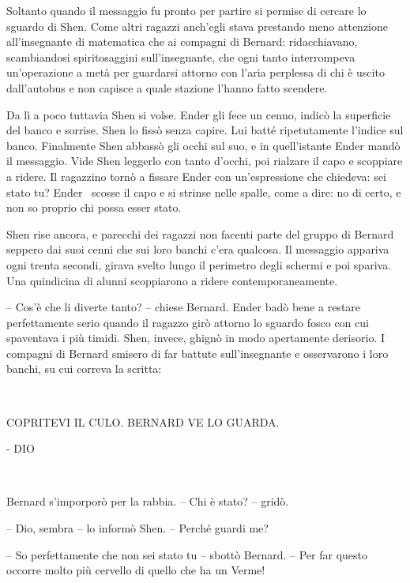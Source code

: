 {Soltanto quando il messaggio fu pronto per partire si permise di
	cercare lo sguardo di Shen. Come altri ragazzi anch'egli stava prestando
	meno attenzione all'insegnante di matematica che ai compagni di Bernard:
	ridacchiavano, scambiandosi spiritosaggini sull'insegnante, che ogni
	tanto interrompeva un'operazione a metà per guardarsi attorno con l'aria
	perplessa di chi è uscito dall'autobus e non capisce a quale stazione
	l'hanno fatto scendere.}

{Da lì a poco tuttavia Shen si volse. Ender gli fece un cenno, indicò la
	superficie del banco e sorrise. Shen lo fissò senza capire. Lui batté
	ripetutamente l'indice sul banco. Finalmente Shen abbassò gli occhi sul
	suo, e in quell'istante Ender mandò il messaggio. Vide Shen leggerlo con
	tanto d'occhi, poi rialzare il capo e scoppiare a ridere. Il ragazzino
	tornò a fissare Ender con un'espressione che chiedeva: sei stato tu?
	Ender ~scosse il capo e si strinse nelle spalle, come a dire: no di
	certo, e non so proprio chi possa esser stato.}

{Shen rise ancora, e parecchi dei ragazzi non facenti parte del gruppo
	di Bernard seppero dai suoi cenni che sui loro banchi c'era qualcosa. Il
	messaggio appariva ogni trenta secondi, girava svelto lungo il perimetro
	degli schermi e poi spariva. Una quindicina di alunni scoppiarono a
	ridere contemporaneamente.}

{-- Cos'è che li diverte tanto? -- chiese Bernard. Ender badò bene a
	restare perfettamente serio quando il ragazzo girò attorno lo sguardo
	fosco con cui spaventava i più timidi. Shen, invece, ghignò in modo
	apertamente derisorio. I compagni di Bernard smisero di far battute
	sull'insegnante e osservarono i loro banchi, su cui correva la scritta:}

{~}

\begin{center}
	{COPRITEVI IL CULO. BERNARD VE LO GUARDA.}
\end{center}

\begin{flushright}
	{- DIO}
\end{flushright}

{~}

{Bernard s'imporporò per la rabbia. -- Chi è stato? -- gridò.}

{-- Dio, sembra -- lo informò Shen. -- Perché guardi me?}

{-- So perfettamente che non sei stato tu -- sbottò Bernard. -- Per far
	questo occorre molto più cervello di quello che ha un Verme!}

